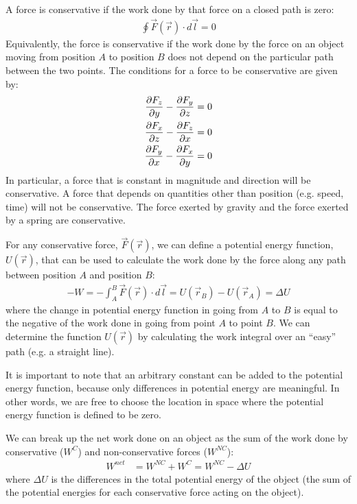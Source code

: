 \begin{chapterSummary}
A force is conservative if the work done by that force on a closed path is zero:
\begin{align*}
\oint \vec F(\vec r) \cdot d\vec l = 0
\end{align*}
Equivalently, the force is conservative if the work done by the force on an object moving from position $A$ to position $B$ does not depend on the particular path between the two points. The conditions for a force to be conservative are given by:
\begin{align*}
\frac{\partial F_z}{\partial y}-\frac{\partial F_y}{\partial z} &= 0 \nonumber\\
\frac{\partial F_x}{\partial z}-\frac{\partial F_z}{\partial x} &= 0\nonumber\\
\frac{\partial F_y}{\partial x}-\frac{\partial F_x}{\partial y} &= 0
\end{align*}
In particular, a force that is constant in magnitude and direction will be conservative. A force that depends on quantities other than position (e.g. speed, time) will not be conservative. The force exerted by gravity and the force exerted by a spring are conservative.

For any conservative force, $\vec F(\vec r)$, we can define a potential energy function, $U(\vec r)$, that can be used to calculate the work done by the force along any path between position $A$ and position $B$:
\begin{align*}
-W = - \int_A^B \vec F(\vec r) \cdot d\vec l = U(\vec r_B) - U(\vec r_A) = \Delta U
\end{align*}
where the change in potential energy function in going from $A$ to $B$ is equal to the negative of the work done in going from point $A$ to point $B$. We can determine the function $U(\vec r)$ by calculating the work integral over an ``easy'' path (e.g. a straight line).

It is important to note that an arbitrary constant can be added to the potential energy function, because only differences in potential energy are meaningful. In other words, we are free to choose the location in space where the potential energy function is defined to be zero.

We can break up the net work done on an object as the sum of the work done by conservative ($W^C$) and non-conservative forces ($W^{NC}$):
\begin{align*}
W^{net}&=W^{NC}+W^{C}=W^{NC}-\Delta U
\end{align*}
where $\Delta U$ is the differences in the total potential energy of the object (the sum of the potential energies for each conservative force acting on the object).


\end{chapterSummary}
